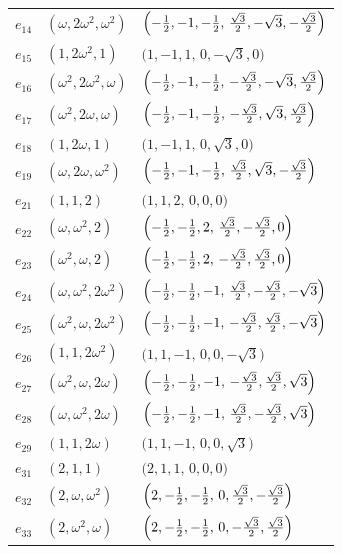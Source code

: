 \documentclass[%
  reprint,
  superscriptaddress,
  amsmath,amssymb,
  pra,
  floatfix,
  longbibliography
]{revtex4-2}
\begin{document}
\begin{longtable}{lll}
$e_{14}$ & $(\omega,2\omega^2,\omega^2)$ &
$\Bigl(-\tfrac12,-1,-\tfrac12,\,\tfrac{\sqrt{3}}{2},-\sqrt{3},-\tfrac{\sqrt{3}}{2}\Bigr)$ \\
$e_{15}$ & $(1,2\omega^2,1)$ &
$\bigl(1,-1,1,\,0,-\sqrt{3},0\bigr)$ \\
$e_{16}$ & $(\omega^2,2\omega^2,\omega)$ &
$\Bigl(-\tfrac12,-1,-\tfrac12,\,-\tfrac{\sqrt{3}}{2},-\sqrt{3},\tfrac{\sqrt{3}}{2}\Bigr)$ \\
$e_{17}$ & $(\omega^2,2\omega,\omega)$ &
$\Bigl(-\tfrac12,-1,-\tfrac12,\,-\tfrac{\sqrt{3}}{2},\sqrt{3},\tfrac{\sqrt{3}}{2}\Bigr)$ \\
$e_{18}$ & $(1,2\omega,1)$ &
$\bigl(1,-1,1,\,0,\sqrt{3},0\bigr)$ \\
$e_{19}$ & $(\omega,2\omega,\omega^2)$ &
$\Bigl(-\tfrac12,-1,-\tfrac12,\,\tfrac{\sqrt{3}}{2},\sqrt{3},-\tfrac{\sqrt{3}}{2}\Bigr)$ \\
$e_{21}$ & $(1,1,2)$ &
$\bigl(1,1,2,\,0,0,0\bigr)$ \\
$e_{22}$ & $(\omega,\omega^2,2)$ &
$\Bigl(-\tfrac12,-\tfrac12,2,\,\tfrac{\sqrt{3}}{2},-\tfrac{\sqrt{3}}{2},0\Bigr)$ \\
$e_{23}$ & $(\omega^2,\omega,2)$ &
$\Bigl(-\tfrac12,-\tfrac12,2,\,-\tfrac{\sqrt{3}}{2},\tfrac{\sqrt{3}}{2},0\Bigr)$ \\
$e_{24}$ & $(\omega,\omega^2,2\omega^2)$ &
$\Bigl(-\tfrac12,-\tfrac12,-1,\,\tfrac{\sqrt{3}}{2},-\tfrac{\sqrt{3}}{2},-\sqrt{3}\Bigr)$ \\
$e_{25}$ & $(\omega^2,\omega,2\omega^2)$ &
$\Bigl(-\tfrac12,-\tfrac12,-1,\,-\tfrac{\sqrt{3}}{2},\tfrac{\sqrt{3}}{2},-\sqrt{3}\Bigr)$ \\
$e_{26}$ & $(1,1,2\omega^2)$ &
$\bigl(1,1,-1,\,0,0,-\sqrt{3}\bigr)$ \\
$e_{27}$ & $(\omega^2,\omega,2\omega)$ &
$\Bigl(-\tfrac12,-\tfrac12,-1,\,-\tfrac{\sqrt{3}}{2},\tfrac{\sqrt{3}}{2},\sqrt{3}\Bigr)$ \\
$e_{28}$ & $(\omega,\omega^2,2\omega)$ &
$\Bigl(-\tfrac12,-\tfrac12,-1,\,\tfrac{\sqrt{3}}{2},-\tfrac{\sqrt{3}}{2},\sqrt{3}\Bigr)$ \\
$e_{29}$ & $(1,1,2\omega)$ &
$\bigl(1,1,-1,\,0,0,\sqrt{3}\bigr)$ \\
$e_{31}$ & $(2,1,1)$ &
$\bigl(2,1,1,\,0,0,0\bigr)$ \\
$e_{32}$ & $(2,\omega,\omega^2)$ &
$\Bigl(2,-\tfrac12,-\tfrac12,\,0,\tfrac{\sqrt{3}}{2},-\tfrac{\sqrt{3}}{2}\Bigr)$ \\
$e_{33}$ & $(2,\omega^2,\omega)$ &
$\Bigl(2,-\tfrac12,-\tfrac12,\,0,-\tfrac{\sqrt{3}}{2},\tfrac{\sqrt{3}}{2}\Bigr)$ \\

\end{longtable}
\end{document}

